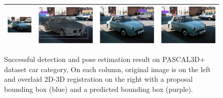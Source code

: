 \documentclass[10pt,twocolumn,letterpaper]{article}
\begin{document}
\begin{figure}[h]
\begin{tabular}{|cc|cc|}
  \includegraphics[width=0.24\linewidth]{supp/pas_car18a.png} &
  \includegraphics[width=0.24\linewidth]{supp/pas_car18b.png} & 
  \includegraphics[width=0.24\linewidth]{supp/pas_car18c.png} &
  \includegraphics[width=0.24\linewidth]{supp/pas_car18d.png} \\
  \hline
  \end{tabular}
  \caption{Successful detection and pose estimation result on PASCAL3D+ dataset
  car category, On each column, original image is on the left and overlaid
  2D-3D registration on the right with a proposal bounding box (blue) and a
  predicted bounding box (purple).} 
  \label{fig:pascal3d_car_good}
\end{figure}
\end{document}
